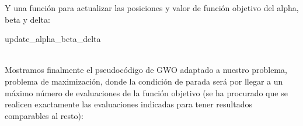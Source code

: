 \documentclass[11pt,a4paper]{article}
\theoremstyle{definition}
\begin{document}
	
	Y una función para actualizar las posiciones y valor de función objetivo del alpha, beta y delta:\\
		
	\begin{algorithm}[H]
		\caption{update\_alpha\_beta\_delta}
	\end{algorithm}~\\
	
	Mostramos finalmente el pseudocódigo de GWO adaptado a nuestro problema, problema de maximización, donde la condición de parada será por llegar a un máximo número de evaluaciones de la función objetivo (se ha procurado que se realicen exactamente las evaluaciones indicadas para tener resultados comparables al resto):\\
		
\end{document}
